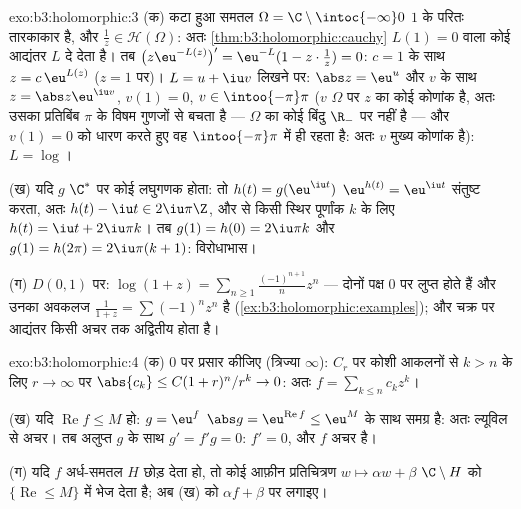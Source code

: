 \begin{solution}{exo:b3:holomorphic:3}
(क) कटा हुआ समतल $\Omega = \C\setminus\intoc{-\infty}0$ $1$ के परितः तारकाकार है, और $\frac1z \in \mathcal H(\Omega)$: अतः \cref{thm:b3:holomorphic:cauchy}
$L(1) = 0$ वाला कोई आद्यंतर $L$ दे देता है। तब $\bigl(z\eu^{-L(z)}\bigr)' =
\eu^{-L}(1 - z\cdot\frac1z) = 0$: $c
= 1$ के साथ $z = c\,\eu^{L(z)}$
($z = 1$ पर)। $L = u + \iu v$ लिखने पर: $\abs z = \eu^u$ और $v$  के साथ $z = \abs z\eu^{\iu v}$, $v(1) = 0$, $v \in \intoo{-\pi}\pi$
($v$  $\Omega$ पर $z$ का कोई  कोणांक है, अतः उसका प्रतिबिंब
$\pi$ के विषम गुणजों से बचता है --- $\Omega$ का कोई बिंदु $\R_-$ पर नहीं है
--- और $v(1) = 0$ को धारण करते हुए वह $\intoo{-\pi}\pi$ में ही रहता है: अतः $v$ मुख्य
कोणांक है): $L = \log$।

(ख) यदि $g$ $\C^*$ पर कोई  लघुगणक होता: तो $h(t) =
g(\eu^{\iu t})$ $\eu^{h(t)} = \eu^{\iu t}$ संतुष्ट करता,
अतः $h(t)
- \iu t \in 2\iu\pi\Z$, और  से किसी स्थिर पूर्णांक $k$ के लिए $h(t) = \iu t +
2\iu\pi k$। तब
$g(1) = h(0) =
2\iu\pi k$ और $g(1) = h(2\pi) = 2\iu\pi(k + 1)$: विरोधाभास।

(ग) $D(0,1)$ पर: $\log(1 + z) =
\sum_{n\geq1}\frac{(-1)^{n+1}}{n}z^n$ --- दोनों पक्ष $0$ पर लुप्त होते हैं और उनका
अवकलज $\frac1{1+z} = \sum(-1)^nz^n$ है (\cref{ex:b3:holomorphic:examples}); और  चक्र पर आद्यंतर किसी अचर तक अद्वितीय
होता है।
\end{solution}

\begin{solution}{exo:b3:holomorphic:4}
(क) $0$ पर प्रसार कीजिए (त्रिज्या $\infty$): $C_r$ पर कोशी आकलनों से
$k > n$ के लिए $r \to
\infty$ पर $\abs{c_k} \leq C(1 + r)^n/r^k \to 0$: अतः $f = \sum_{k\leq n}c_kz^k$।

(ख) यदि $\operatorname{Re}f \leq M$ हो: $g = \eu^f$ $\abs g = \eu^{\operatorname{Re}f} \leq \eu^M$ के साथ समग्र है: अतः ल्यूविल से अचर। तब
अलुप्त $g$ के साथ $g' = f'g = 0$: $f' =
0$, और $f$ अचर है।

(ग) यदि $f$ अर्ध-समतल $H$ छोड़ देता हो, तो कोई आफ़ीन प्रतिचित्रण
$w \mapsto
\alpha w + \beta$ $\C\setminus H$ को $\{\operatorname{Re} \leq M\}$ में भेज देता है; अब (ख) को $\alpha f +
\beta$ पर लगाइए।
\end{solution}

